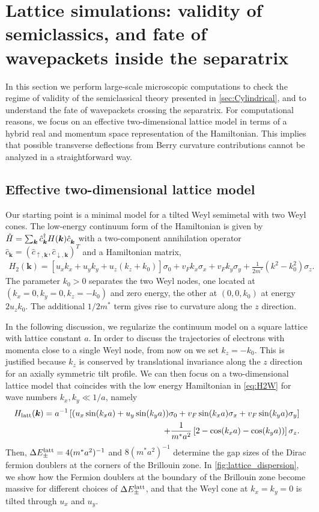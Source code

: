 \documentclass[submission, Phys]{SciPost}
\begin{document}
\section{Lattice simulations: validity of semiclassics, and fate of wave\-packets inside the separatrix}
\label{sec:Lattice}
In this section we perform large-scale microscopic computations to check the regime of validity of the semiclassical theory presented in \cref{sec:Cylindrical}, and to understand the fate of wavepackets crossing the separatrix. For computational reasons, we focus on an effective two-dimensional lattice model in terms of a hybrid real and momentum space representation of the Hamiltonian. This implies that possible transverse deflections from Berry curvature contributions cannot be analyzed in a straightforward way.

\subsection{Effective two-dimensional lattice model}
Our starting point is a minimal model for a tilted Weyl semimetal with two Weyl cones. The low-energy continuum form of the Hamiltonian is given by $\hat H = \sum_{\bm k}\hat c^\dag_{\bm k}H(\bm k)\hat c^{\vphantom\dag}_{\bm k}$ with a two-component annihilation operator $\hat c_{\bm k}=(\hat c_{\uparrow,\bm k}, \hat c_{\downarrow,\bm k})^T$ and a Hamiltonian matrix,
\begin{align}
    H_2(\bm k) = \left[ u_xk_x + u_yk_y + u_z(k_z+k_0) \right]\sigma_0 + v_Fk_x\sigma_x + v_Fk_y\sigma_y + \frac{1}{2m^*}(k^2-k_0^2)\sigma_z.
    \label{eq:H2W}
\end{align}
The parameter $k_0>0$ separates the two Weyl nodes, one located at $(k_x=0,k_y=0,k_z=-k_0)$ and zero energy, the other at $(0,0,k_0)$ at energy $2u_zk_0$. The additional $1/2m^*$ term gives rise to curvature along the $z$ direction.

In the following discussion, we regularize the continuum model on a square lattice with lattice constant $a$.
In order to discuss the trajectories of electrons with momenta close to a single Weyl node, from now on we set $k_z=-k_0$.
This is justified because $k_z$ is conserved by translational invariance along the $z$ direction for an axially symmetric tilt profile.
We can then focus on a two-dimensional lattice model that coincides with the low energy Hamiltonian in \cref{eq:H2W} for wave numbers $k_x,k_y\ll 1/a$, namely
\begin{align}\label{eq:H1W_momentum_space}
    H_{\rm latt}(\bm k) = a^{-1}\left[(u_x\sin(k_xa) + u_y\sin(k_ya))\sigma_0 + v_F\sin(k_xa)\sigma_x + v_F\sin(k_ya)\sigma_y\right]
    \nonumber\\
    + \frac1{m^* a^2}\left[2 - \cos(k_xa) - \cos(k_ya))\right]\sigma_z.
\end{align}
Then, $\Delta E_\pm^{\rm latt}=4(m^*a^2)^{-1}$ and $8(m^*a^2)^{-1}$ determine the gap sizes of the Dirac fermion doublers at the corners of the Brillouin zone.
In \cref{fig:lattice_dispersion}, we show how the Fermion doublers at the boundary of the Brillouin zone become massive for different choices of $\Delta E_{\pm}^{\rm latt}$, and that the Weyl cone at $k_x=k_y=0$ is tilted through $u_x$ and $u_y$.
\end{document}
